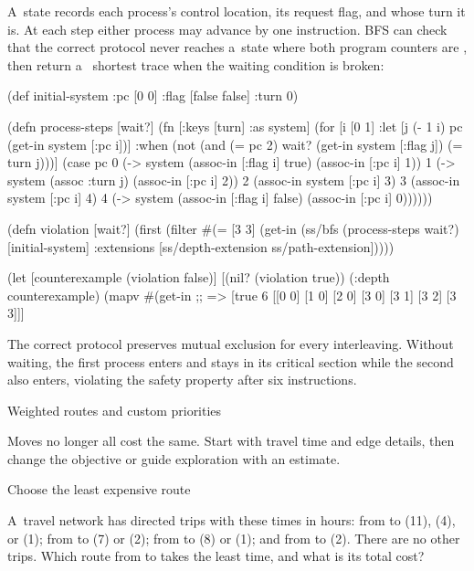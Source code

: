{{\smallskip
{} A~state records each process's control location,
its request flag, and whose turn it is. At each step either process may
advance by one instruction. BFS can check that the correct protocol never
reaches a~state where both program counters are , then return a~
shortest trace when the waiting condition is broken:

\begtt {}
(def initial-system {:pc [0 0] :flag [false false] :turn 0})

(defn process-steps [wait?]
  (fn [{:keys [turn] :as system}]
    (for [i [0 1]
          :let [j (- 1 i)
                pc (get-in system [:pc i])]
          :when (not (and (= pc 2) wait?
                          (get-in system [:flag j]) (= turn j)))]
      (case pc
        0 (-> system (assoc-in [:flag i] true) (assoc-in [:pc i] 1))
        1 (-> system (assoc :turn j) (assoc-in [:pc i] 2))
        2 (assoc-in system [:pc i] 3)
        3 (assoc-in system [:pc i] 4)
        4 (-> system (assoc-in [:flag i] false)
              (assoc-in [:pc i] 0))))))

(defn violation [wait?]
  (first (filter #(= [3 3] (get-in %
                 (ss/bfs (process-steps wait?) [initial-system]
                         {:extensions [ss/depth-extension
                                       ss/path-extension]}))))

(let [counterexample (violation false)]
  [(nil? (violation true))
   (:depth counterexample)
   (mapv #(get-in %
;; => [true 6 [[0 0] [1 0] [2 0] [3 0] [3 1] [3 2] [3 3]]]
\endtt

The correct protocol preserves mutual exclusion for every interleaving.
Without waiting, the first process enters and stays in its critical
section while the second also enters, violating the safety property after
six instructions.

\sec Weighted routes and custom priorities

Moves no longer all cost the same. Start with travel time and edge details,
then change the objective or guide exploration with an estimate.

\secc Choose the least expensive route

 A~travel network has directed trips with these
times in hours: from  to  (11), 
(4), or  (1); from  to  (7) or
 (2); from  to  (8) or
 (1); and from  to  (2). There
are no other trips. Which route from  to  takes
the least time, and what is its total cost?

}}
